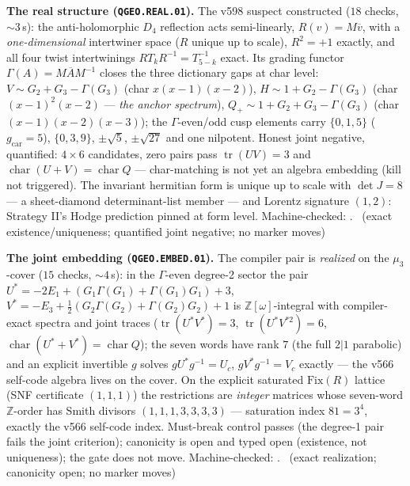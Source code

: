 \documentclass[11pt,a4paper]{article}
\newcommand{\gcar}{g_{\mathrm{car}}}
\theoremstyle{definition}
\begin{document}
\par\smallskip\noindent\textbf{The real structure
(\texttt{QGEO.REAL.01}).}
The v598 suspect constructed ($18$ checks, ${\sim}3$\,s): the
anti-holomorphic $D_4$ reflection acts semi-linearly,
$R(v)=M\overline{v}$, with a \emph{one-dimensional} intertwiner space
($R$ unique up to scale), $R^2=+1$ exactly, and all four twist
intertwinings $RT_kR^{-1}=T_{5-k}^{-1}$ exact.  Its grading functor
$\Gamma(A)=M\overline{A}M^{-1}$ closes the three dictionary gaps at
char level: $V\sim G_2+G_3-\Gamma(G_3)$ (char $x(x-1)(x-2)$),
$H\sim 1+G_2-\Gamma(G_3)$ (char $(x-1)^2(x-2)$ --- \emph{the anchor
spectrum}), $Q_+\sim 1+G_2+G_3-\Gamma(G_3)$ (char $(x-1)(x-2)(x-3)$);
the $\Gamma$-even/odd cusp elements carry $\{0,1,5\}$ ($\gcar=5$),
$\{0,3,9\}$, $\pm\sqrt5$, $\pm\sqrt{27}$ and one nilpotent.  Honest
joint negative, quantified: $4\times6$ candidates, zero pairs pass
$\operatorname{tr}(UV)=3$ and $\operatorname{char}(U{+}V)=
\operatorname{char}Q$ --- char-matching is not yet an algebra
embedding (kill not triggered).  The invariant hermitian form is
unique up to scale with $\det J=8$ --- a sheet-diamond
determinant-list member --- and Lorentz signature $(1,2)$: Strategy
II's Hodge prediction pinned at form level.
Machine-checked: .
\mE\ (exact existence/uniqueness; quantified joint negative; no
marker moves)
\par\smallskip

\par\smallskip\noindent\textbf{The joint embedding
(\texttt{QGEO.EMBED.01}).}
The compiler pair is \emph{realized} on the $\mu_3$-cover ($15$
checks, ${\sim}4$\,s): in the $\Gamma$-even degree-2 sector the pair
$U^*=-2E_1+(G_1\Gamma(G_1)+\Gamma(G_1)G_1)+3$,
$V^*=-E_3+\tfrac12(G_2\Gamma(G_2)+\Gamma(G_2)G_2)+1$ is
$\mathbb{Z}[\omega]$-integral with compiler-exact spectra and joint
traces ($\operatorname{tr}(U^*V^*)=3$,
$\operatorname{tr}(U^*V^{*2})=6$,
$\operatorname{char}(U^*{+}V^*)=\operatorname{char}Q$); the seven
words have rank $7$ (the full $2|1$ parabolic) and an explicit
invertible $g$ solves $gU^*g^{-1}=U_c$, $gV^*g^{-1}=V_c$ exactly ---
the v566 self-code algebra lives on the cover.  On the explicit
saturated $\mathrm{Fix}(R)$ lattice (SNF certificate $(1,1,1)$) the
restrictions are \emph{integer} matrices whose seven-word
$\mathbb{Z}$-order has Smith divisors $(1,1,1,3,3,3,3)$ ---
saturation index $81=3^4$, exactly the v566 self-code index.
Must-break control passes (the degree-1 pair fails the joint
criterion); canonicity is open and typed open (existence, not
uniqueness); the gate does not move.
Machine-checked: .
\mE\ (exact realization; canonicity open; no marker moves)
\par\smallskip
\end{document}
